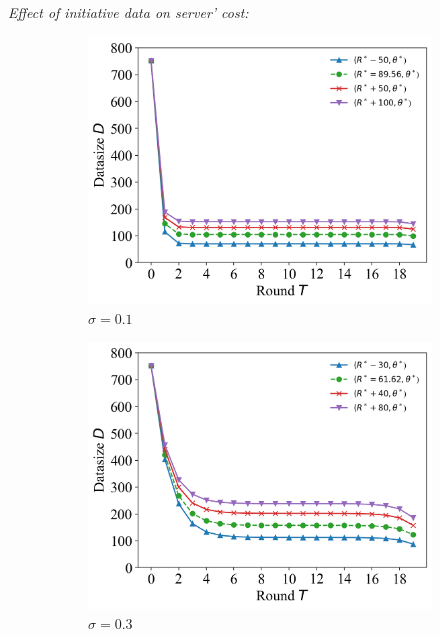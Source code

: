 \documentclass{article}
\theoremstyle{plain}
\theoremstyle{definition}
\theoremstyle{remark}
\begin{document}
\textit{Effect of initiative data on server' cost:}
\begin{figure}
	\begin{subfigure}{0.31\textwidth}
		\centering
    \includegraphics[width=\textwidth]{figures/figure_72_A.png}
    \caption{$\sigma=0.1$}
	\end{subfigure}
  \quad
	\begin{subfigure}{0.31\textwidth}
		\centering
		\includegraphics[width=\textwidth]{figures/figure_72_B.png}
    \caption{$\sigma=0.3$}
	\end{subfigure}
  \quad
  \begin{subfigure}{0.31\textwidth}
		\centering

\end{subfigure}
\end{figure}
\end{document}
